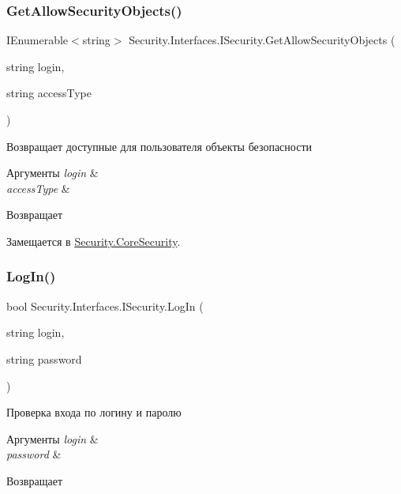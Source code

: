 \subsubsection{\texorpdfstring{Get\+Allow\+Security\+Objects()}{GetAllowSecurityObjects()}}
{\footnotesize\ttfamily I\+Enumerable$<$string$>$ Security.\+Interfaces.\+I\+Security.\+Get\+Allow\+Security\+Objects (\begin{DoxyParamCaption}\item[{string}]{login,  }\item[{string}]{access\+Type }\end{DoxyParamCaption})}



Возвращает доступные для пользователя объекты безопасности 


\begin{DoxyParams}{Аргументы}
{\em login} & \\
\hline
{\em access\+Type} & \\
\hline
\end{DoxyParams}
\begin{DoxyReturn}{Возвращает}

\end{DoxyReturn}


Замещается в \hyperlink{class_security_1_1_core_security_ad9dd82159ce61eba5ab68fed5167ec87}{Security.\+Core\+Security}.

\mbox{\label{interface_security_1_1_interfaces_1_1_i_security_a85a48460a5d327c495647539670049f8}} 
\subsubsection{\texorpdfstring{Log\+In()}{LogIn()}}
{\footnotesize\ttfamily bool Security.\+Interfaces.\+I\+Security.\+Log\+In (\begin{DoxyParamCaption}\item[{string}]{login,  }\item[{string}]{password }\end{DoxyParamCaption})}



Проверка входа по логину и паролю 


\begin{DoxyParams}{Аргументы}
{\em login} & \\
\hline
{\em password} & \\
\hline
\end{DoxyParams}
\begin{DoxyReturn}{Возвращает}

\end{DoxyReturn}


